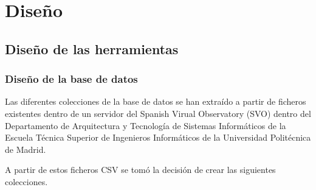 \chapter{Diseño}

\section{Diseño de las herramientas}

\subsection{Diseño de la base de datos}
Las diferentes colecciones de la base de datos se han extraído a partir de ficheros existentes dentro de un servidor del Spanish Virual Observatory (SVO) dentro del Departamento de Arquitectura y Tecnología de Sistemas Informáticos de la Escuela Técnica Superior de Ingenieros Informáticos de la Universidad Politécnica de Madrid. 

A partir de estos ficheros CSV se tomó la decisión de crear las siguientes colecciones.


